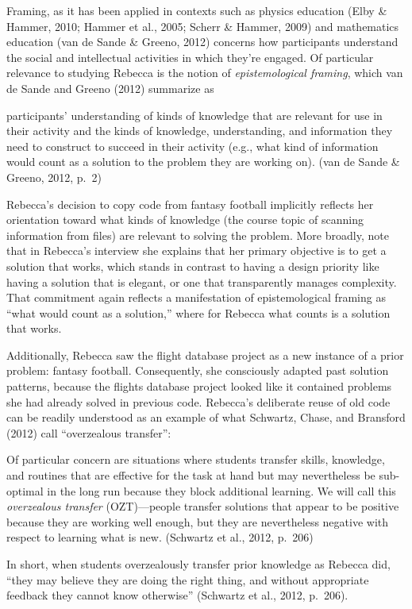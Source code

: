Framing, as it has been applied in contexts such as physics education (Elby \& Hammer, 2010; Hammer et al., 2005; Scherr \& Hammer, 2009) and mathematics education (van de Sande \& Greeno, 2012) concerns how participants understand the social and intellectual activities in which they're engaged. Of particular relevance to studying Rebecca is the notion of \emph{epistemological framing}, which van de Sande and Greeno (2012) summarize as

participants' understanding of kinds of knowledge that are relevant for use in their activity and the kinds of knowledge, understanding, and information they need to construct to succeed in their activity (e.g., what kind of information would count as a solution to the problem they are working on). (van de Sande \& Greeno, 2012, p.~2)

Rebecca's decision to copy code from fantasy football implicitly reflects her orientation toward what kinds of knowledge (the course topic of scanning information from files) are relevant to solving the problem. More broadly, note that in Rebecca's interview she explains that her primary objective is to get a solution that works, which stands in contrast to having a design priority like having a solution that is elegant, or one that transparently manages complexity. That commitment again reflects a manifestation of epistemological framing as ``what would count as a solution,'' where for Rebecca what counts is a solution that works.

Additionally, Rebecca saw the flight database project as a new instance of a prior problem: fantasy football. Consequently, she consciously adapted past solution patterns, because the flights database project looked like it contained problems she had already solved in previous code. Rebecca's deliberate reuse of old code can be readily understood as an example of what Schwartz, Chase, and Bransford (2012) call ``overzealous transfer'':

Of particular concern are situations where students transfer skills, knowledge, and routines that are effective for the task at hand but may nevertheless be sub-optimal in the long run because they block additional learning. We will call this \emph{overzealous transfer} (OZT)---people transfer solutions that appear to be positive because they are working well enough, but they are nevertheless negative with respect to learning what is new. (Schwartz et al., 2012, p.~206)

In short, when students overzealously transfer prior knowledge as Rebecca did, ``they may believe they are doing the right thing, and without appropriate feedback they cannot know otherwise'' (Schwartz et al., 2012, p.~206).

